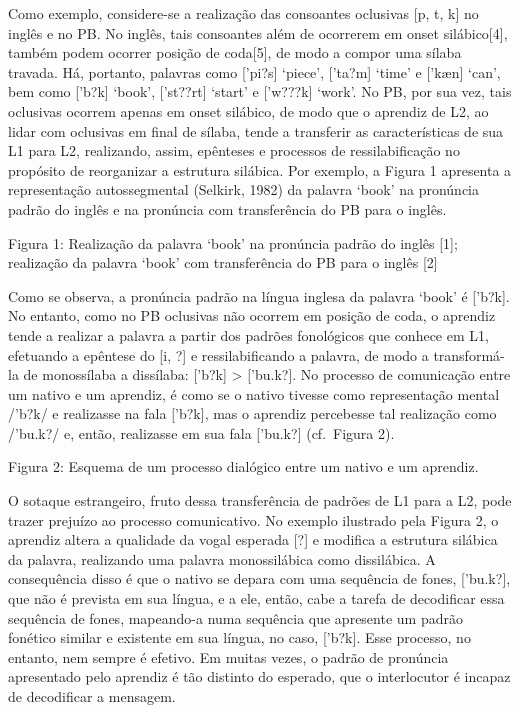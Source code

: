 Como exemplo, considere-se a realiza\c{c}\~ao das consoantes  oclusivas  [p,
t, k{]} no ingl\^es e no PB. No ingl\^es, tais consoantes al\'em de ocorrerem
em onset sil\'abico{[}4{]}, tamb\'em podem ocorrer posi\c{c}\~ao de coda{[}5{]},
de modo a compor uma s\'ilaba travada. H\'a, portanto, palavras como
{[}'pi?s{]} `piece', {[}'ta?m{]} `time' e {[}'kæn{]} `can', bem como
{[}'b?k{]} `book', {[}'st??rt{]} `start' e {[}'w???k{]} `work'. No PB,
por sua vez, tais oclusivas ocorrem apenas em onset sil\'abico, de modo
que o aprendiz de L2, ao lidar com oclusivas em final de s\'ilaba, tende a
transferir as caracter\'isticas de sua L1 para L2, realizando, assim,
ep\^enteses e processos de ressilabifica\c{c}\~ao no prop\'osito de reorganizar a
estrutura sil\'abica. Por exemplo, a Figura 1 apresenta a representa\c{c}\~ao
autossegmental (Selkirk, 1982) da palavra `book' na pron\'uncia padr\~ao do
ingl\^es e na pron\'uncia com transfer\^encia do PB para o ingl\^es.

Figura 1: Realiza\c{c}\~ao da palavra `book' na pron\'uncia padr\~ao do ingl\^es
{[}1{]}; realiza\c{c}\~ao da palavra `book' com transfer\^encia do PB para o
ingl\^es {[}2{]}

Como se observa, a pron\'uncia padr\~ao na l\'ingua inglesa da palavra `book'
\'e {[}'b?k{]}. No entanto, como no PB oclusivas n\~ao ocorrem em posi\c{c}\~ao de
coda, o aprendiz tende a realizar a palavra a partir dos padr\~oes
fonol\'ogicos que conhece em L1, efetuando a ep\^entese do {[}i, ?{]} e
ressilabificando a palavra, de modo a transform\'a-la de monoss\'ilaba a
diss\'ilaba: {[}'b?k{]} \textgreater{} {[}'bu.k?{]}. No processo de
comunica\c{c}\~ao entre um nativo e um aprendiz, \'e como se o nativo tivesse
como representa\c{c}\~ao mental /'b?k/ e realizasse na fala {[}'b?k{]}, mas o
aprendiz percebesse tal realiza\c{c}\~ao como /'bu.k?/ e, ent\~ao, realizasse em
sua fala {[}'bu.k?{]} (cf.~Figura 2).

Figura 2: Esquema de um processo dial\'ogico entre um nativo e um
aprendiz.

O sotaque estrangeiro, fruto dessa transfer\^encia de padr\~oes de L1 para a
L2, pode trazer preju\'izo ao processo comunicativo. No exemplo ilustrado
pela Figura 2, o aprendiz altera a qualidade da vogal esperada {[}?{]} e
modifica a estrutura sil\'abica da palavra, realizando uma palavra
monossil\'abica como dissil\'abica. A consequ\^encia disso \'e que o nativo se
depara com uma sequ\^encia de fones, {[}'bu.k?{]}, que n\~ao \'e prevista em
sua l\'ingua, e a ele, ent\~ao, cabe a tarefa de decodificar essa sequ\^encia
de fones, mapeando-a numa sequ\^encia que apresente um padr\~ao fon\'etico
similar e existente em sua l\'ingua, no caso, {[}'b?k{]}. Esse processo,
no entanto, nem sempre \'e efetivo. Em muitas vezes, o padr\~ao de pron\'uncia
apresentado pelo aprendiz \'e t\~ao distinto do esperado, que o interlocutor
\'e incapaz de decodificar a mensagem.

